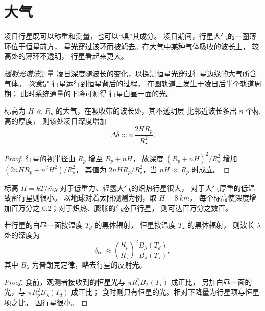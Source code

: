 \section{大气}\label{sec:b3:exoplanets:atmospheres}

凌日行星既可以称重和测量，也可以“嗅”其成分。
凌日期间，行星大气的一圈薄环位于恒星前方，
星光穿过该环而被滤去。在大气中某种气体吸收的波长上，
较高处的薄环不透明，
行星看起来更大。

\begin{definition}[透射光谱法；次食]\label{def:b3:exoplanets:transmission}
\emph{透射光谱法}测量
凌日深度随波长的变化，以探测恒星光穿过行星边缘的大气所含气体。
\emph{次食}是
行星运行到恒星背后的过程，
在圆轨道上发生于凌日后半个轨道周期；
此时系统通量的下降可测得
行星白昼一面的光。
\end{definition}

\begin{proposition}[透射信号]\label{prop:b3:exoplanets:transmission}
标高为 $H \ll R_p$ 的大气，在吸收带的波长处，其不透明层
比邻近波长多出 $n$ 个标高的厚度，
则该处凌日深度增加
\[
\Delta\delta \approx n\,\frac{2HR_p}{R_\star^2} .
\]
\end{proposition}

\begin{proof}
行星的视半径由 $R_p$ 增至 $R_p + nH$，
故深度 $(R_p + nH)^2/R_\star^2$ 增加 $(2nHR_p + n^2H^2)/R_\star^2$，
其值为 $2nHR_p/R_\star^2$，当 $nH \ll R_p$ 时成立。
\end{proof}

标高 $H = kT/\bar m g$ 对于低重力、轻氢大气的炽热行星很大，
对于大气厚重的低温致密行星则很小。
以地球对着太阳观测为例，取 $H = \qty{8}{km}$，
每个标高使深度增加百万分之 0.2；对于炽热、膨胀的气态巨行星，
则可达百万分之数百。

\begin{proposition}[次食深度]\label{prop:b3:exoplanets:eclipse}
若行星的白昼一面按温度 $T_d$ 的黑体辐射，
恒星按温度 $T_\star$ 的黑体辐射，
则波长 $\lambda$ 处的深度为
\[
\delta_\mathrm{ecl} \approx \left(\frac{R_p}{R_\star}\right)^2
  \frac{B_\lambda(T_d)}{B_\lambda(T_\star)},
\]
其中 $B_\lambda$ 为普朗克定律，略去行星的反射光。
\end{proposition}

\begin{proof}
食前，观测者接收到的恒星光与
$\pi R_\star^2 B_\lambda(T_\star)$ 成正比，
另加白昼一面的光，与 $\pi R_p^2 B_\lambda(T_d)$ 成正比；
食时则只有恒星的光。相对下降量为行星项与恒星项之比，
因行星很小。
\end{proof}

